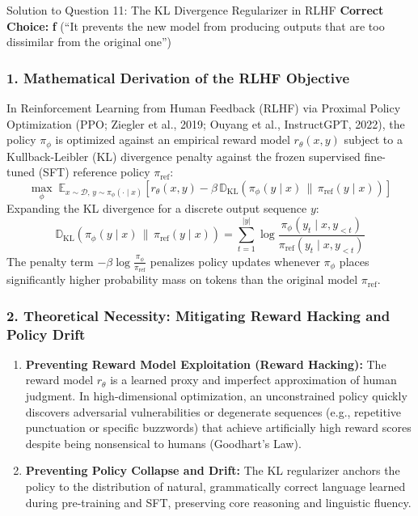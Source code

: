 \documentclass[11pt,a4paper]{article}
\begin{document}
\begin{solutionbox}{Solution to Question 11: The KL Divergence Regularizer in RLHF}
\textbf{Correct Choice:} \textbf{f} (``It prevents the new model from producing outputs that are too dissimilar from the original one'')

\subsubsection*{1. Mathematical Derivation of the RLHF Objective}
In Reinforcement Learning from Human Feedback (RLHF) via Proximal Policy Optimization (PPO; Ziegler et al., 2019; Ouyang et al., InstructGPT, 2022), the policy $\pi_\phi$ is optimized against an empirical reward model $r_\theta(x, y)$ subject to a Kullback-Leibler (KL) divergence penalty against the frozen supervised fine-tuned (SFT) reference policy $\pi_{\text{ref}}$:
\begin{equation}
    \max_\phi \; \mathbb{E}_{x \sim \mathcal{D}, \, y \sim \pi_\phi(\cdot \mid x)} \left[ r_\theta(x, y) - \beta \, \mathbb{D}_{\text{KL}}\left(\pi_\phi(y \mid x) \,\|\, \pi_{\text{ref}}(y \mid x)\right) \right]
\end{equation}
Expanding the KL divergence for a discrete output sequence $y$:
\begin{equation}
    \mathbb{D}_{\text{KL}}\left(\pi_\phi(y \mid x) \,\|\, \pi_{\text{ref}}(y \mid x)\right) = \sum_{t=1}^{|y|} \log \frac{\pi_\phi(y_t \mid x, y_{<t})}{\pi_{\text{ref}}(y_t \mid x, y_{<t})}
\end{equation}
The penalty term $-\beta \log \frac{\pi_\phi}{\pi_{\text{ref}}}$ penalizes policy updates whenever $\pi_\phi$ places significantly higher probability mass on tokens than the original model $\pi_{\text{ref}}$.

\subsubsection*{2. Theoretical Necessity: Mitigating Reward Hacking and Policy Drift}
\begin{enumerate}
    \item \textbf{Preventing Reward Model Exploitation (Reward Hacking):} The reward model $r_\theta$ is a learned proxy and imperfect approximation of human judgment. In high-dimensional optimization, an unconstrained policy quickly discovers adversarial vulnerabilities or degenerate sequences (e.g., repetitive punctuation or specific buzzwords) that achieve artificially high reward scores despite being nonsensical to humans (Goodhart's Law).
    \item \textbf{Preventing Policy Collapse and Drift:} The KL regularizer anchors the policy to the distribution of natural, grammatically correct language learned during pre-training and SFT, preserving core reasoning and linguistic fluency.
\end{enumerate}


\end{solutionbox}
\end{document}
